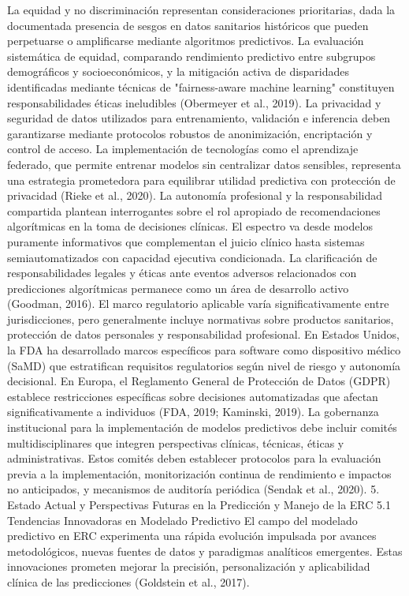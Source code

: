 \documentclass{article}
\begin{document}
\begin{multicols}{2}
La equidad y no discriminación representan consideraciones prioritarias, dada la documentada presencia de sesgos en datos sanitarios históricos que pueden perpetuarse o amplificarse mediante algoritmos predictivos. La evaluación sistemática de equidad, comparando rendimiento predictivo entre subgrupos demográficos y socioeconómicos, y la mitigación activa de disparidades identificadas mediante técnicas de "fairness-aware machine learning" constituyen responsabilidades éticas ineludibles (Obermeyer et al., 2019).
La privacidad y seguridad de datos utilizados para entrenamiento, validación e inferencia deben garantizarse mediante protocolos robustos de anonimización, encriptación y control de acceso. La implementación de tecnologías como el aprendizaje federado, que permite entrenar modelos sin centralizar datos sensibles, representa una estrategia prometedora para equilibrar utilidad predictiva con protección de privacidad (Rieke et al., 2020).
La autonomía profesional y la responsabilidad compartida plantean interrogantes sobre el rol apropiado de recomendaciones algorítmicas en la toma de decisiones clínicas. El espectro va desde modelos puramente informativos que complementan el juicio clínico hasta sistemas semiautomatizados con capacidad ejecutiva condicionada. La clarificación de responsabilidades legales y éticas ante eventos adversos relacionados con predicciones algorítmicas permanece como un área de desarrollo activo (Goodman, 2016).
El marco regulatorio aplicable varía significativamente entre jurisdicciones, pero generalmente incluye normativas sobre productos sanitarios, protección de datos personales y responsabilidad profesional. En Estados Unidos, la FDA ha desarrollado marcos específicos para software como dispositivo médico (SaMD) que estratifican requisitos regulatorios según nivel de riesgo y autonomía decisional. En Europa, el Reglamento General de Protección de Datos (GDPR) establece restricciones específicas sobre decisiones automatizadas que afectan significativamente a individuos (FDA, 2019; Kaminski, 2019).
La gobernanza institucional para la implementación de modelos predictivos debe incluir comités multidisciplinares que integren perspectivas clínicas, técnicas, éticas y administrativas. Estos comités deben establecer protocolos para la evaluación previa a la implementación, monitorización continua de rendimiento e impactos no anticipados, y mecanismos de auditoría periódica (Sendak et al., 2020).
 5. Estado Actual y Perspectivas Futuras en la Predicción y Manejo de la ERC
 5.1 Tendencias Innovadoras en Modelado Predictivo
El campo del modelado predictivo en ERC experimenta una rápida evolución impulsada por avances metodológicos, nuevas fuentes de datos y paradigmas analíticos emergentes. Estas innovaciones prometen mejorar la precisión, personalización y aplicabilidad clínica de las predicciones (Goldstein et al., 2017).

\end{multicols}
\end{document}
